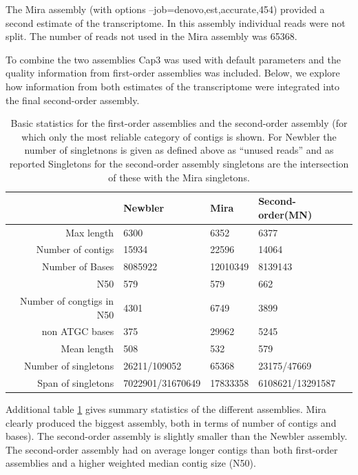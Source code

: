 \documentclass[12pt,a4paper]{article}
\begin{document}
The Mira assembly (with options --job=denovo,est,accurate,454)
provided a second estimate of the transcriptome. In this assembly
individual reads were not split. The number of reads not used in the
Mira assembly was 65368.

To combine the two assemblies Cap3 was used with default parameters
and the quality information from first-order assemblies was
included. Below, we explore how information from both estimates of the
transcriptome were integrated into the final second-order assembly.

\begin{table}[ht]
\begin{center}
\begin{tabular}{rlll}
  \hline
 & Newbler & Mira & Second-order(MN) \\ 
  \hline
Max length & 6300 & 6352 & 6377 \\ 
  Number of contigs & 15934 & 22596 & 14064 \\ 
  Number of Bases &  8085922 & 12010349 &  8139143 \\ 
  N50 & 579 & 579 & 662 \\ 
  Number of congtigs in N50 & 4301 & 6749 & 3899 \\ 
  non ATGC bases &   375 & 29962 &  5245 \\ 
  Mean length & 508 & 532 & 579 \\ 
  Number of singletons & 26211/109052 & 65368 & 23175/47669 \\ 
  Span of singletons & 7022901/31670649 & 17833358 & 6108621/13291587 \\ 
   \hline
\end{tabular}
\caption[Basic statistics for the first-order assemblies and the second-order assembly]{Basic statistics for the first-order assemblies and the second-order assembly (for which only the most reliable category of contigs is shown. For Newbler the number of singletnons is given as defined above as ``unused reads'' and as reported Singletons for the second-order assembly singletons are the intersection of these with the Mira singletons.}
\label{tab:pc}
\end{center}
\end{table}
Additional table \ref{tab:pc} gives summary statistics of the different
assemblies. Mira clearly produced the biggest assembly, both in terms
of number of contigs and bases). The second-order assembly is slightly
smaller than the Newbler assembly.  The second-order assembly had on
average longer contigs than both first-order assemblies and a higher
weighted median contig size (N50).
\end{document}
